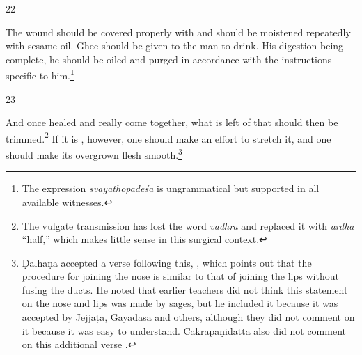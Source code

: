 \begin{translation}
\begin{sloka}
\end{sloka}    
\item[22] 
\begin{sloka}
 The wound should be covered properly with  and should be
moistened repeatedly with sesame oil.  Ghee should be given to the man to drink. 
His digestion being complete, he should be oiled and purged in accordance with
the instructions specific to him.\footnote{The expression \emph{svayathopadeśa}
    is ungrammatical but supported in all available witnesses.}
\end{sloka}
    
\item[23] %
\begin{sloka}
And once healed and really come together, what is left of that  should then be trimmed.\footnote{The vulgate transmission has lost the
    word \emph{vadhra} and replaced it with \emph{ardha} “half,” which makes little
    sense in this surgical  context.} If it is , however, one should
    make an effort to stretch it, and one should make its overgrown flesh
    smooth.\footnote{Ḍalhaṇa  accepted a verse following this, , which
        points out that the procedure for joining the nose is similar to that of joining
        the lips without fusing the ducts. He noted that earlier teachers did not think
        this statement on the nose and lips was made by sages, but he included it because
        it was accepted by Jejjaṭa, Gayadāsa and others, although they did not comment on
        it because it was easy to understand. Cakrapāṇidatta also did not comment on this
        additional verse \citep[133]{acar-1939}.}

\end{sloka}    
    
\end{translation}    
